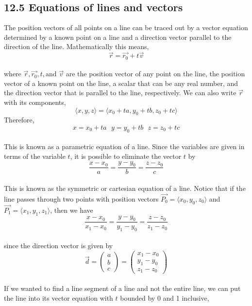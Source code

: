 \documentclass{article}
\begin{document}
	\subsection{12.5 Equations of lines and vectors}

	The position vectors of all points on a line can be traced out by a vector equation
	determined by a known point on a line and a direction vector parallel to the direction
	of the line. Mathematically this means, \\
	\[
		\vec{r}= \vec{r_0}+ t\vec{v}
	\]
	\\ where $\vec{r}, \vec{r_0}, t, \text{and}$ $\vec{v}$ are the position vector
	of any point on the line, the position vector of a known point on the line, a scalar
	that can be any real number, and the direction vector that is parallel to the
	line, respectively. We can also write $\vec{r}$ with its components,
	\[
		\langle x,y,z \rangle =\langle x_{0}+ta,y_{0}+tb,z_{0}+tc \rangle
	\]
	Therefore, \\
	\[
		x=x_{0}+ta \ \ \ y=y_{0}+tb \ \ \ z=z_{0}+tc
	\]
	\\ This is known as a parametric equation of a line. Since the variables are given
	in terms of the variable $t$, it is possible to eliminate the vector $t$ by \\
	\[
		\frac{x-x_{0}}{a}= \frac{y-y_{0}}{b}= \frac{z-z_{0}}{c}
	\]
	\\ This is known as the symmetric or cartesian equation of a line. Notice that
	if the line passes through two points with position vectors $\vec{P_0}= \langle
	x_{0},y_{0},z_{0} \rangle$ and $\vec{P_1}= \langle x_{1},y_{1},z_{1} \rangle$,
	then we have \\
	\[
		\frac{x-x_{0}}{x_{1}-x_{0}}= \frac{y-y_{0}}{y_{1}-y_{0}}= \frac{z-z_{0}}{z_{1}-z_{0}}
	\]
	\\ since the direction vector is given by \\
	\[
		\vec{d}=
		\begin{pmatrix}
			a \\
			b \\
			c
		\end{pmatrix}
		=
		\begin{pmatrix}
			x_{1}-x_{0} \\
			y_{1}-y_{0} \\
			z_{1}-z_{0}
		\end{pmatrix}
	\]
	\\ If we wanted to find a line segment of a line and not the entire line, we can
	put the line into its vector equation with $t$ bounded by 0 and 1 inclusive,
\end{document}
